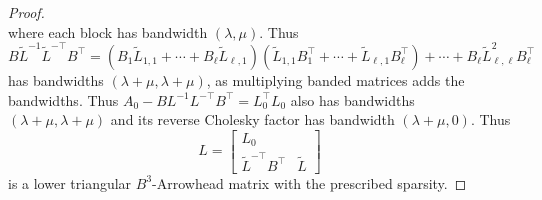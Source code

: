 \documentclass[10pt,a4paper]{amsart}
\begin{document}
\begin{proof}
\[\]
where each block has bandwidth $(\lambda,\mu)$. Thus 
\[
	B \tilde  L^{-1} \tilde  L^{-\top} B^\top = (B_1 \tilde L_{1,1} + \cdots + B_\ell \tilde L_{\ell,1}) ( \tilde L_{1,1} B_1^\top + \cdots +  \tilde L_{\ell,1} B_\ell^\top)  + \cdots + B_\ell \tilde L_{\ell,\ell}^2 B_\ell^\top
\]
has bandwidths $(\lambda+\mu,\lambda+\mu)$, as multiplying banded matrices adds the bandwidths. Thus $A_0 - B L^{-1} L^{-\top} B^\top = L_0^\top L_0$ also has bandwidths $(\lambda+\mu,\lambda+\mu)$ and its reverse Cholesky factor has bandwidth $(\lambda+\mu,0)$. Thus 
\[
	L =  \begin{bmatrix} L_0 \\
		\tilde L^{-\top} B^\top & \tilde L
	\end{bmatrix}
\]
is a lower triangular $B^3$-Arrowhead matrix with the prescribed sparsity.

\end{proof}
\end{document}
